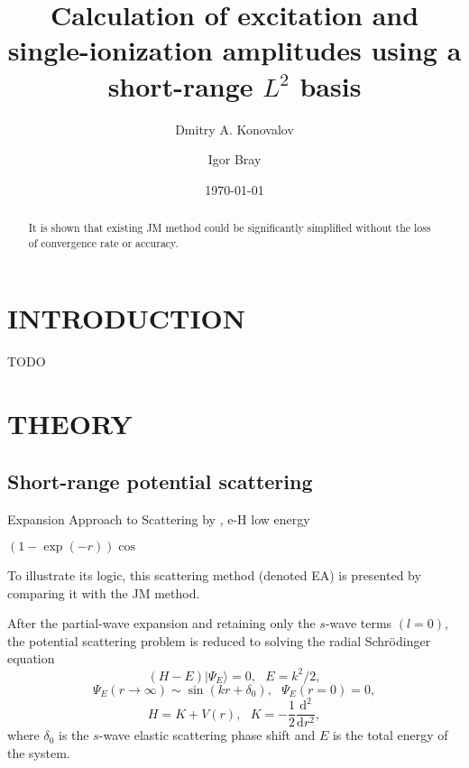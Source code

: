 \documentclass[aip
, pra
, showpacs
, aps
, twocolumn
, groupedaddress
, floatfix
]{revtex4}
\newcommand{\beq}{\begin{equation}}
\newcommand{\eeq}{\end{equation}}
\begin{document}
\title {Calculation of excitation and single-ionization amplitudes using a short-range $L^2$ basis}

\author{Dmitry A. Konovalov}

\author{Igor Bray}


\date{\today}

\begin{abstract}
It is shown that existing JM method could be significantly simplified without the loss of convergence rate or accuracy.

\end{abstract}

\maketitle

\section{INTRODUCTION}
TODO

\section{THEORY}
\subsection{Short-range potential scattering}


Expansion Approach to Scattering by \citet{Harris67}, e-H low energy \cite{MH67}

$(1-\exp(-r))\cos$ \cite{Nesbet68}


To illustrate its logic, this  scattering method (denoted EA) is presented by comparing it with the JM method.


After the partial-wave expansion and retaining only the $s$-wave terms $(l=0)$,
the potential scattering problem is reduced \cite{LL85, Taylor72} to solving the radial Schr\"odinger equation
\beq
(H-E) | \Psi_E \rangle =0, \ \ \ E=k^2/2,  \label{H_E_Psi_E}
\eeq
\beq
\Psi_E(r \rightarrow \infty) \sim \sin(kr+\delta_0), \ \ \ \Psi_E(r= 0)=0,
\eeq
\beq
H=K+V(r), \ \ \ K=-\frac{1}{2} \frac{\mbox{d}^2}{\mbox{d}r^2}, \label{K}
\eeq
where $\delta_0$ is the $s$-wave elastic scattering phase shift and $E$ is the total energy of the system.
\end{document}
